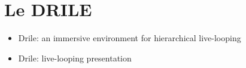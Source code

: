 \section{Le DRILE}
\begin{frame}
\begin{itemize}
\item Drile: an immersive environment for hierarchical live-looping
\item Drile: live-looping presentation 
\end{itemize}


\end{frame}
